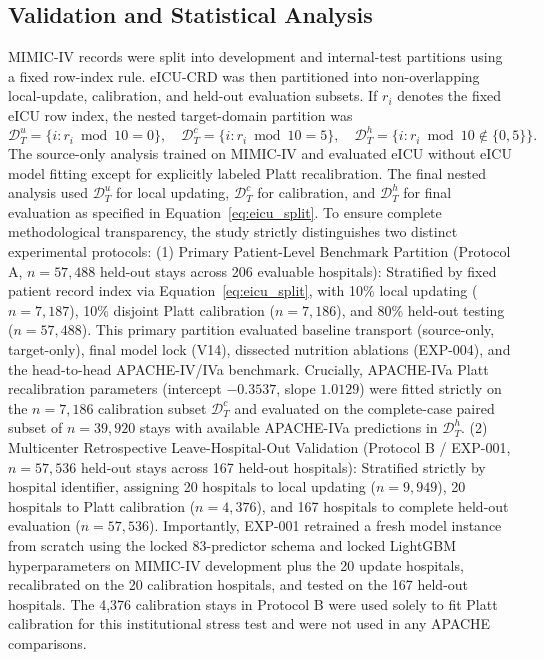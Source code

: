 \documentclass[utf8]{FrontiersinVancouver}
\newcommand{\re}[1]{#1}
\begin{document}
\subsection{Validation and Statistical Analysis}
MIMIC-IV records were split into development and internal-test partitions using a fixed row-index rule. eICU-CRD was then partitioned into non-overlapping local-update, calibration, and held-out evaluation subsets. If $r_i$ denotes the fixed eICU row index, the nested target-domain partition was
\begin{equation}
\mathcal{D}_{T}^{u}=\{i:r_i\bmod 10=0\},\quad
\mathcal{D}_{T}^{c}=\{i:r_i\bmod 10=5\},\quad
\mathcal{D}_{T}^{h}=\{i:r_i\bmod 10\notin\{0,5\}\}.
\label{eq:eicu_split}
\end{equation}
The source-only analysis trained on MIMIC-IV and evaluated eICU without eICU model fitting except for explicitly labeled Platt recalibration. The final nested analysis used $\mathcal{D}_{T}^{u}$ for local updating, $\mathcal{D}_{T}^{c}$ for calibration, and $\mathcal{D}_{T}^{h}$ for final evaluation as specified in Equation~\ref{eq:eicu_split}. \re{To ensure complete methodological transparency, the study strictly distinguishes two distinct experimental protocols: (1) Primary Patient-Level Benchmark Partition (Protocol A, $n=57,488$ held-out stays across 206 evaluable hospitals): Stratified by fixed patient record index via Equation~\ref{eq:eicu_split}, with 10\% local updating ($n=7,187$), 10\% disjoint Platt calibration ($n=7,186$), and 80\% held-out testing ($n=57,488$). This primary partition evaluated baseline transport (source-only, target-only), final model lock (V14), dissected nutrition ablations (EXP-004), and the head-to-head APACHE-IV/IVa benchmark. Crucially, APACHE-IVa Platt recalibration parameters (intercept $-0.3537$, slope $1.0129$) were fitted strictly on the $n=7,186$ calibration subset $\mathcal{D}_{T}^{c}$ and evaluated on the complete-case paired subset of $n=39,920$ stays with available APACHE-IVa predictions in $\mathcal{D}_{T}^{h}$. (2) Multicenter Retrospective Leave-Hospital-Out Validation (Protocol B / EXP-001, $n=57,536$ held-out stays across 167 held-out hospitals): Stratified strictly by hospital identifier, assigning 20 hospitals to local updating ($n=9,949$), 20 hospitals to Platt calibration ($n=4,376$), and 167 hospitals to complete held-out evaluation ($n=57,536$). Importantly, EXP-001 retrained a fresh model instance from scratch using the locked 83-predictor schema and locked LightGBM hyperparameters on MIMIC-IV development plus the 20 update hospitals, recalibrated on the 20 calibration hospitals, and tested on the 167 held-out hospitals. The 4,376 calibration stays in Protocol B were used solely to fit Platt calibration for this institutional stress test and were not used in any APACHE comparisons.}
\end{document}
